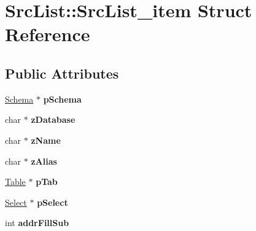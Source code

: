 \hypertarget{struct_src_list_1_1_src_list__item}{\section{Src\-List\-:\-:Src\-List\-\_\-item Struct Reference}
\label{struct_src_list_1_1_src_list__item}
}
\subsection*{Public Attributes}
\begin{DoxyCompactItemize}
\item 
\hypertarget{struct_src_list_1_1_src_list__item_a021ffb4d9282b6ce171bd57c4da97bf3}{\hyperlink{struct_schema}{Schema} $\ast$ {\bfseries p\-Schema}}\label{struct_src_list_1_1_src_list__item_a021ffb4d9282b6ce171bd57c4da97bf3}

\item 
\hypertarget{struct_src_list_1_1_src_list__item_a2f7bf0921794dc46d74d2546fc10f7de}{char $\ast$ {\bfseries z\-Database}}\label{struct_src_list_1_1_src_list__item_a2f7bf0921794dc46d74d2546fc10f7de}

\item 
\hypertarget{struct_src_list_1_1_src_list__item_afee5c5a84594fed8100be3cdb3e3ff1c}{char $\ast$ {\bfseries z\-Name}}\label{struct_src_list_1_1_src_list__item_afee5c5a84594fed8100be3cdb3e3ff1c}

\item 
\hypertarget{struct_src_list_1_1_src_list__item_a461ef8d80828ed8dd4409b9244ae2919}{char $\ast$ {\bfseries z\-Alias}}\label{struct_src_list_1_1_src_list__item_a461ef8d80828ed8dd4409b9244ae2919}

\item 
\hypertarget{struct_src_list_1_1_src_list__item_a8779b2d10d0e25af78ad90e57f9cd4f6}{\hyperlink{struct_table}{Table} $\ast$ {\bfseries p\-Tab}}\label{struct_src_list_1_1_src_list__item_a8779b2d10d0e25af78ad90e57f9cd4f6}

\item 
\hypertarget{struct_src_list_1_1_src_list__item_ab44822fca7618c4f41f4f770ad41425b}{\hyperlink{struct_select}{Select} $\ast$ {\bfseries p\-Select}}\label{struct_src_list_1_1_src_list__item_ab44822fca7618c4f41f4f770ad41425b}

\item 
\hypertarget{struct_src_list_1_1_src_list__item_a1fb4f55d13641e11f07c3e535fd7cf1d}{int {\bfseries addr\-Fill\-Sub}}\label{struct_src_list_1_1_src_list__item_a1fb4f55d13641e11f07c3e535fd7cf1d}


\end{DoxyCompactItemize}
